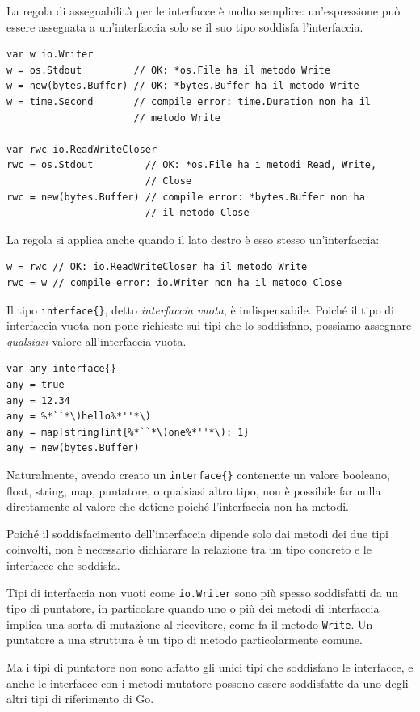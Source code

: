La regola di assegnabilità per le interfacce è molto semplice: un'espressione può essere assegnata a un'interfaccia solo se il suo tipo soddisfa l'interfaccia.
\begin{lstlisting}[frame=single, label={lst:lstlisting6-3.1}]
var w io.Writer
w = os.Stdout         // OK: *os.File ha il metodo Write
w = new(bytes.Buffer) // OK: *bytes.Buffer ha il metodo Write
w = time.Second       // compile error: time.Duration non ha il
                      // metodo Write

var rwc io.ReadWriteCloser
rwc = os.Stdout         // OK: *os.File ha i metodi Read, Write,
                        // Close
rwc = new(bytes.Buffer) // compile error: *bytes.Buffer non ha
                        // il metodo Close
\end{lstlisting}
La regola si applica anche quando il lato destro è esso stesso un'interfaccia:
\begin{lstlisting}[frame=single, label={lst:lstlisting6-3.2}]
w = rwc // OK: io.ReadWriteCloser ha il metodo Write
rwc = w // compile error: io.Writer non ha il metodo Close
\end{lstlisting}
Il tipo \verb|interface{}|, detto \textit{interfaccia vuota}, è indispensabile.
Poiché il tipo di interfaccia vuota non pone richieste sui tipi che lo soddisfano, possiamo assegnare \textit{qualsiasi} valore all'interfaccia vuota.
\begin{lstlisting}[frame=single, label={lst:lstlisting6-3.3}]
var any interface{}
any = true
any = 12.34
any = %*``*\)hello%*''*\)
any = map[string]int{%*``*\)one%*''*\): 1}
any = new(bytes.Buffer)
\end{lstlisting}
Naturalmente, avendo creato un \verb|interface{}| contenente un valore booleano, float, string, map, puntatore, o qualsiasi altro tipo, non è possibile far nulla direttamente al valore che detiene poiché l'interfaccia non ha metodi.

Poiché il soddisfacimento dell'interfaccia dipende solo dai metodi dei due tipi coinvolti, non è necessario dichiarare la relazione tra un tipo concreto e le interfacce che soddisfa.

Tipi di interfaccia non vuoti come \verb|io.Writer| sono più spesso soddisfatti da un tipo di puntatore, in particolare quando uno o più dei metodi di interfaccia implica una sorta di mutazione al ricevitore, come fa il metodo \verb|Write|.
Un puntatore a una struttura è un tipo di metodo particolarmente comune.

Ma i tipi di puntatore non sono affatto gli unici tipi che soddisfano le interfacce, e anche le interfacce con i metodi mutatore possono essere soddisfatte da uno degli altri tipi di riferimento di Go.

